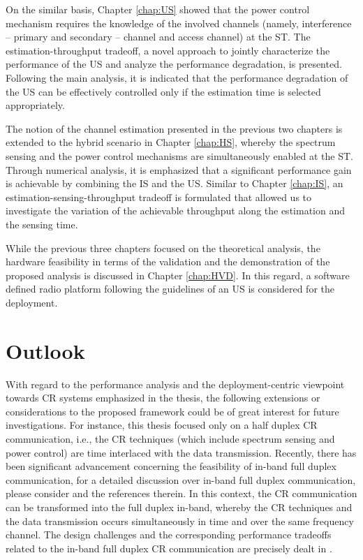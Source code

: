 On the similar basis, Chapter \ref{chap:US} showed that the power control mechanism requires the knowledge of the involved channels (namely, interference -- primary and secondary -- channel and access channel) at the ST. The estimation-throughput tradeoff, a novel approach to jointly characterize the performance of the US and analyze the performance degradation, is presented. Following the main analysis, it is indicated that the performance degradation of the US can be effectively controlled only if the estimation time is selected appropriately.   

The notion of the channel estimation presented in the previous two chapters is extended to the hybrid scenario in Chapter \ref{chap:HS}, whereby the spectrum sensing and the power control mechanisms are simultaneously enabled at the ST. Through numerical analysis, it is emphasized that a significant performance gain is achievable by combining the IS and the US. Similar to Chapter \ref{chap:IS}, an estimation-sensing-throughput tradeoff is formulated that allowed us to investigate the variation of the achievable throughput along the estimation and the sensing time. 

While the previous three chapters focused on the theoretical analysis, the hardware feasibility in terms of the validation and the demonstration of the proposed analysis is discussed in Chapter \ref{chap:HVD}. In this regard, a software defined radio platform following the guidelines of an US is considered for the deployment. 


\section{Outlook}
With regard to the performance analysis and the deployment-centric viewpoint towards CR systems emphasized in the thesis, the following extensions or considerations to the proposed framework could be of great interest for future investigations. For instance, this thesis focused only on a half duplex CR communication, i.e., the CR techniques (which include spectrum sensing and power control) are time interlaced with the data transmission. Recently, there has been significant advancement concerning the feasibility of in-band full duplex communication, for a detailed discussion over in-band full duplex communication, please consider \cite{Bhar13, Sab14, Liu15} and the references therein. In this context, the CR communication can be transformed into the full duplex in-band, whereby the CR techniques and the data transmission occurs simultaneously in time and over the same frequency channel. The design challenges and the corresponding performance tradeoffs related to the in-band full duplex CR communication are precisely dealt in \cite{Liao15, Kim15}. 

